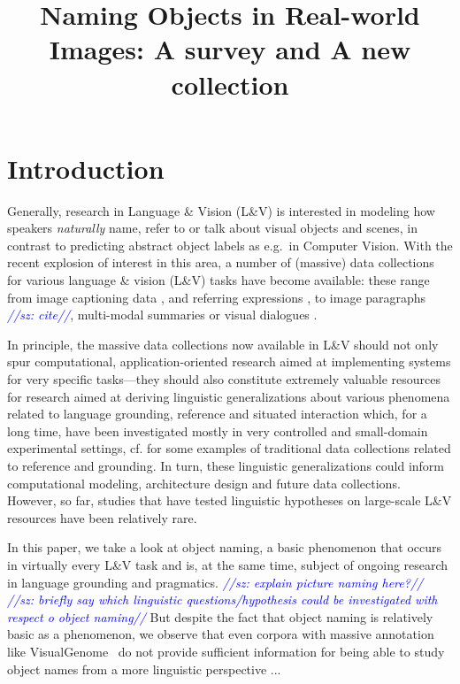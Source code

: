 \documentclass[10pt, a4paper]{article}
\title{Naming Objects in Real-world Images: A survey and A new \sz{linguistically motivated????} collection}
\newcommand{\vg}{VG\xspace}
\newcommand{\sz}[1]{\textcolor{blue}{\emph{//sz: #1//}}}
\begin{document}
\maketitleabstract

\section{Introduction}

Generally, research in Language \& Vision (L\&V) is interested in modeling how speakers \textit{naturally} name, refer to or talk about visual objects and scenes, in contrast to predicting abstract object labels as e.g.\ in Computer Vision. With the recent explosion of interest in this area, a number of (massive) data collections for various language \& vision (L\&V) tasks have become available: these range from image captioning data \cite{fangetal:2015,devlin:imcaqui,Bernardietal:automatic}, and referring expressions \cite{Kazemzadeh2014,mao15,Yu2016}, to image paragraphs \sz{cite}, multi-modal summaries or visual dialogues \cite{das2017visual,vries2017guesswhat}.

In principle, the massive data collections now available in L\&V should not only spur computational, application-oriented research aimed at implementing systems for very specific tasks---they should also constitute extremely valuable resources for research aimed at deriving linguistic generalizations about various phenomena related to language grounding, reference and situated interaction which, for a long time, have been investigated mostly in very controlled and small-domain experimental settings, cf. \cite{anderson1991hcrc,fernangen:sigd07,krahmer:2012,takenobu2012rex,zarriess2016pentoref} for some examples of traditional data collections related to reference and grounding.  
In turn, these linguistic generalizations could inform computational modeling, architecture design and future data collections.
However, so far, studies that have tested linguistic hypotheses on large-scale L\&V resources have been relatively rare. 

In this paper, we take a look at object naming, a basic phenomenon that occurs in virtually every L\&V task and is, at the same time, subject of ongoing research in language grounding and pragmatics. \sz{explain picture naming here?} \sz{briefly say which linguistic questions/hypothesis could be investigated with respect o object naming} But despite the fact that object naming is relatively basic as a phenomenon, we observe that even corpora with massive annotation like VisualGenome~\cite[\vg henceforth]{krishna2016visualgenome} do not provide sufficient information for being able to study object names from a more linguistic perspective ... 
\end{document}
